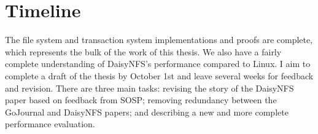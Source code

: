 \documentclass[fontsize=12pt,paper=letter,cleardoublepage=plain,twoside=false]{scrbook}
\begin{document}
\section{Timeline}
The file system and transaction system implementations and proofs are complete,
which represents the bulk of the work of this thesis. We also have a fairly
complete understanding of DaisyNFS's performance compared to Linux. I aim to
complete a draft of the thesis by October 1st and leave several weeks for
feedback and revision. There are three main tasks: revising the story of the
DaisyNFS paper based on feedback from SOSP; removing redundancy between the
GoJournal and DaisyNFS papers; and describing a new and more complete
performance evaluation.

\backmatter

\begin{spacing}{1}
{}

\end{spacing}
\end{document}
